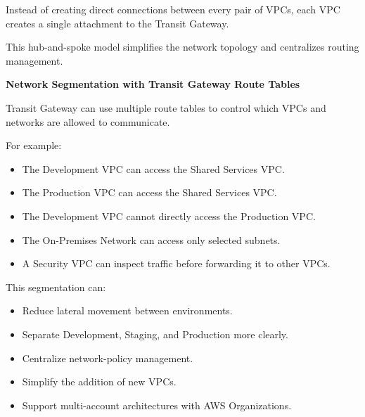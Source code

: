 Instead of creating direct connections between every pair of VPCs, each
VPC creates a single attachment to the Transit Gateway.

\begin{Shaded}
\begin{Highlighting}[]
\NormalTok{                    |}
\NormalTok{                    |}
\NormalTok{                    |}
\NormalTok{                    |}
\end{Highlighting}
\end{Shaded}

This hub-and-spoke model simplifies the network topology and centralizes
routing management.

\vspace{0.5em}\noindent\textbf{Network Segmentation with Transit Gateway Route
Tables}\par

Transit Gateway can use multiple route tables to control which VPCs and
networks are allowed to communicate.

For example:

\begin{itemize}
\tightlist
\item
  The Development VPC can access the Shared Services VPC.
\item
  The Production VPC can access the Shared Services VPC.
\item
  The Development VPC cannot directly access the Production VPC.
\item
  The On-Premises Network can access only selected subnets.
\item
  A Security VPC can inspect traffic before forwarding it to other VPCs.
\end{itemize}

This segmentation can:

\begin{itemize}
\tightlist
\item
  Reduce lateral movement between environments.
\item
  Separate Development, Staging, and Production more clearly.
\item
  Centralize network-policy management.
\item
  Simplify the addition of new VPCs.
\item
  Support multi-account architectures with AWS Organizations.
\end{itemize}

